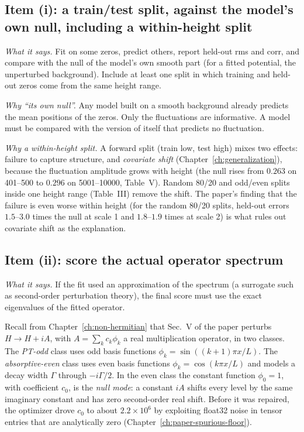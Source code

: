 \subsection{Item (i): a train/test split, against the model's own null, including a within-height split}

\emph{What it says.} Fit on some zeros, predict others, report held-out rms and corr, and compare with the null of the model's own smooth part (for a fitted potential, the unperturbed background). Include at least one split in which training and held-out zeros come from the same height range.

\emph{Why ``its own null''.} Any model built on a smooth background already predicts the mean positions of the zeros. Only the fluctuations are informative. A model must be compared with the version of itself that predicts no fluctuation.

\emph{Why a within-height split.} A forward split (train low, test high) mixes two effects: failure to capture structure, and \emph{covariate shift} (Chapter~\ref{ch:generalization}), because the fluctuation amplitude grows with height (the null rises from $0.263$ on 401--500 to $0.296$ on 5001--10000, Table~V). Random 80/20 and odd/even splits inside one height range (Table~III) remove the shift. The paper's finding that the failure is even worse within height (for the random 80/20 splits, held-out errors $1.5$--$3.0$ times the null at scale 1 and $1.8$--$1.9$ times at scale 2) is what rules out covariate shift as the explanation.

\subsection{Item (ii): score the actual operator spectrum}

\emph{What it says.} If the fit used an approximation of the spectrum (a surrogate such as second-order perturbation theory), the final score must use the exact eigenvalues of the fitted operator.

Recall from Chapter~\ref{ch:non-hermitian} that Sec.~V of the paper perturbs $H\to H+iA$, with $A=\sum_k c_k\phi_k$ a real multiplication operator, in two classes. The \emph{PT-odd} class uses odd basis functions $\phi_k=\sin((k+1)\pi x/L)$. The \emph{absorptive-even} class uses even basis functions $\phi_k=\cos(k\pi x/L)$ and models a decay width $\Gamma$ through $-i\Gamma/2$. In the even class the constant function $\phi_0=1$, with coefficient $c_0$, is the \emph{null mode}: a constant $iA$ shifts every level by the same imaginary constant and has zero second-order real shift. Before it was repaired, the optimizer drove $c_0$ to about $2.2\times10^6$ by exploiting float32 noise in tensor entries that are analytically zero (Chapter~\ref{ch:paper-spurious-floor}).

